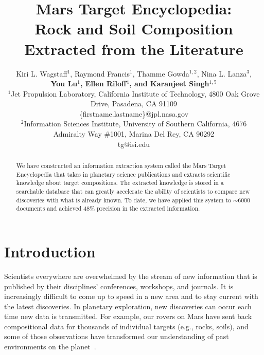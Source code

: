 \documentclass[letterpaper]{article} %
\begin{document}
%
\title{Mars Target Encyclopedia: \\ Rock and Soil Composition Extracted
from the Literature}
\author{
Kiri L. Wagstaff$^1$,
Raymond Francis$^1$,
Thamme Gowda$^{1,2}$,
Nina L. Lanza$^3$,\\
{\Large \bf You Lu$^1$,
Ellen Riloff$^4$, and
Karanjeet Singh$^{1,5}$}\\
$^1$Jet Propulsion Laboratory, California Institute of Technology,
4800 Oak Grove Drive, Pasadena, CA 91109\\
\{firstname.lastname\}@jpl.nasa.gov\\
$^2$Information Sciences Institute, University of Southern
California,
4676 Admiralty Way \#1001, Marina Del Rey, CA 90292\\
tg@isi.edu
}
\maketitle
\begin{abstract}
We have constructed an information extraction system called the Mars
Target Encyclopedia that takes in planetary science publications
and extracts scientific knowledge about target compositions.
The extracted knowledge is stored in a searchable database that can
greatly accelerate the ability of scientists to compare new
discoveries with what is already known.  To date, we have applied this
system to $\sim$6000 documents and achieved 48\% precision in the
extracted information.  
\end{abstract}

\section{Introduction}

Scientists everywhere are overwhelmed by the stream of new information
that is published by their disciplines' conferences, workshops, and
journals.  It is increasingly difficult to come up to speed in a
new area and to stay current with the latest discoveries.  In
planetary exploration, new discoveries can occur each time
new data is transmitted.  For example, our rovers on Mars have sent
back compositional data for thousands of individual targets (e.g.,
rocks, soils), and some of those observations have transformed our
understanding of past environments on the
planet~\cite{grotzinger:ykb14}. 
\end{document}

